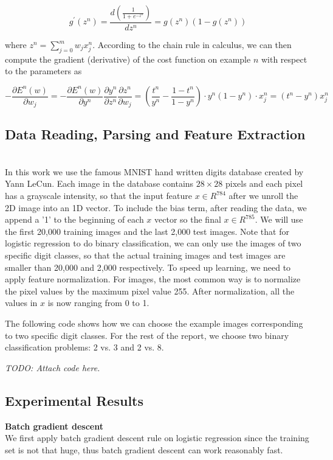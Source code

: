 \documentclass{article} %
\begin{document}
\begin{equation}
	g^{\prime}(z^{n}) = \frac{d(\frac{1}{1+e^{-z^{n}}})}{dz^{n}} = g(z^{n})(1-g(z^{n}))
\end{equation}

where $z ^{n}= \sum_{j=0}^{m}w_{j}x_{j}^{n}$. According to the chain rule in calculus, we can then compute the gradient (derivative) of the cost function on example $n$ with respect to the parameters as

\begin{equation}
	-\frac{\partial E^{n}(w)}{\partial w_{j}} = -\frac{\partial E^{n}(w)}{\partial y^{n}}\frac{\partial y^{n}}{\partial z^{n}}\frac{\partial z^{n}}{\partial w_{j}} = (\frac{t^{n}}{y^{n}}-\frac{1-t^{n}}{1-y^{n}})\cdot y^{n}(1-y^{n})\cdot x_{j}^{n} = (t^{n}-y^{n})x_{j}^{n}
\end{equation}

\subsection{Data Reading, Parsing and Feature Extraction} \\
In this work we use the famous MNIST hand written digits database created by Yann LeCun. Each image in the database contains $28 \times 28$ pixels and each pixel has a grayscale intensity, so that the input feature $x \in R^{784}$ after we unroll the 2D image into an 1D vector. To include the bias term, after reading the data, we append a '1' to the beginning of each $x$ vector so the final $x \in R^{785}$. We will use the first 20,000 training images and the last 2,000 test images. Note that for logistic regression to do binary classification, we can only use the images of two specific digit classes, so that the actual training images and test images are smaller than 20,000 and 2,000 respectively. To speed up learning, we need to apply feature normalization. For images, the most common way is to normalize the pixel values by the maximum pixel value 255. After normalization, all the values in $x$ is now ranging from 0 to 1.

The following code shows how we can choose the example images corresponding to two specific digit classes. For the rest of the report, we choose two binary classification problems: 2 vs. 3 and 2 vs. 8.

\textit{TODO: Attach code here.}

\subsection{Experimental Results}
\textbf{Batch gradient descent}\\
We first apply batch gradient descent rule on logistic regression since the training set is not that huge, thus batch gradient descent can work reasonably fast. 
\end{document}
